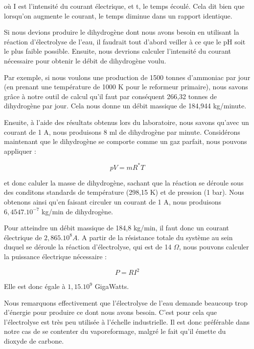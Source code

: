 \documentclass[a4paper, oneside, 12pt]{article}
\begin{document}
où I est l'intensité du courant électrique, et t, le temps écoulé. Cela dit bien que lorsqu'on augmente le courant, le temps diminue dans un rapport identique.

Si nous devions produire le dihydrogène dont nous avons besoin en utilisant la réaction d'électrolyse de l'eau, il faudrait tout d'abord veiller à ce que le pH soit le plus faible possible. Ensuite, nous devrions calculer l'intensité du courant nécessaire pour obtenir le débit de dihydrogène voulu.

Par exemple, si nous voulons une production de 1500 tonnes d'ammoniac par jour (en prenant une température de 1000 K pour le reformeur primaire), nous savons grâce à notre outil de calcul qu'il faut par conséquent 266,32 tonnes de dihydrogène par jour. Cela nous donne un débit massique de 184,944 kg/minute.

Ensuite, à l'aide des résultats obtenus lors du laboratoire, nous savons qu'avec un courant de 1 A, nous produisons 8 ml de dihydrogène par minute. Considérons maintenant que le dihydrogène se comporte comme un gaz parfait, nous pouvons appliquer :

\begin{equation*}
	pV = mR^{*}T
\end{equation*}

et donc caluler la masse de dihydrogène, sachant que la réaction se déroule sous des conditons standards de température (298,15 K) et de pression (1 bar). Nous obtenons ainsi qu'en faisant circuler un courant de 1 A, nous produisons $6,4547.10^{-7}$ kg/min de dihydrogène.

Pour atteindre un débit massique de 184,8 kg/min, il faut donc un courant électrique de $2,865.10^8 A$. A partir de la résistance totale du système au sein duquel se déroule la réaction d'électrolyse, qui est de 14 $\Omega$, nous pouvons calculer la puissance électrique nécessaire : 

\begin{equation*}
	P = RI^{2}
\end{equation*}

Elle est donc égale à $1,15.10^{9}$ GigaWatts.

Nous remarquons effectivement que l'électrolyse de l'eau demande beaucoup trop d'énergie pour produire ce dont nous avons besoin. C'est pour cela que l'électrolyse est très peu utilisée à l'échelle industrielle. Il est donc préférable dans notre cas de se contenter du vaporeformage, malgré le fait qu'il émette du dioxyde de carbone.
\end{document}
